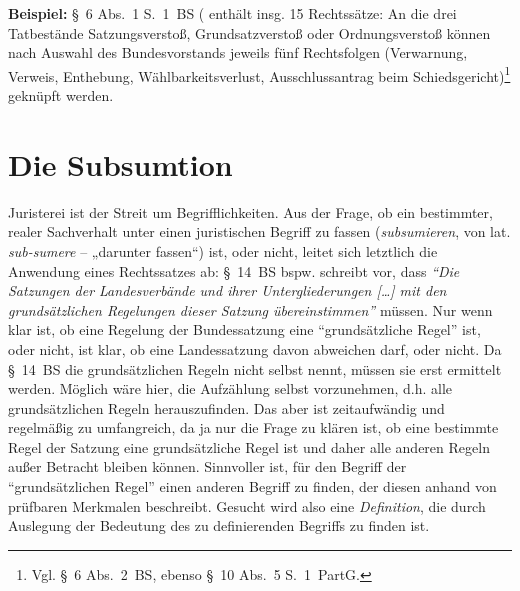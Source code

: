 \textbf{Beispiel:} \S~6 Abs.~1 S.~1~BS ( enthält insg. 15 Rechtssätze:
An die drei Tatbestände Satzungsverstoß, Grundsatzverstoß oder Ordnungsverstoß können nach Auswahl des Bundesvorstands jeweils fünf Rechtsfolgen (Verwarnung, Verweis, Enthebung, Wählbarkeitsverlust, Ausschlussantrag beim Schiedsgericht)\footnote{Vgl. \S~6 Abs.~2~BS, ebenso \S~10 Abs.~5 S.~1~PartG.} geknüpft werden.


\section{Die Subsumtion}
Juristerei ist der Streit um Begrifflichkeiten.
Aus der Frage, ob ein bestimmter, realer Sachverhalt unter einen juristischen Begriff zu fassen (\emph{subsumieren}, von lat. \emph{sub-sumere} – „darunter fassen“) ist, oder nicht, leitet sich letztlich die Anwendung eines Rechtssatzes ab:
\S~14~BS bspw. schreibt vor, dass \emph{\enquote{Die Satzungen der Landesverbände und ihrer Untergliederungen […] mit den grundsätzlichen Regelungen dieser Satzung übereinstimmen}} müssen.
Nur wenn klar ist, ob eine Regelung der Bundessatzung eine \enquote{grundsätzliche Regel} ist, oder nicht, ist klar, ob eine Landessatzung davon abweichen darf, oder nicht.
Da \S~14~BS die grundsätzlichen Regeln nicht selbst nennt, müssen sie erst ermittelt werden.
Möglich wäre hier, die Aufzählung selbst vorzunehmen, d.h. alle grundsätzlichen Regeln herauszufinden.
Das aber ist zeitaufwändig und regelmäßig zu umfangreich, da ja nur die Frage zu klären ist, ob eine bestimmte Regel der Satzung eine grundsätzliche Regel ist und daher alle anderen Regeln außer Betracht bleiben können.
Sinnvoller ist, für den Begriff der \enquote{grundsätzlichen Regel} einen anderen Begriff zu finden, der diesen anhand von prüfbaren Merkmalen beschreibt.
Gesucht wird also eine \emph{Definition}, die durch Auslegung der Bedeutung des zu definierenden Begriffs zu finden ist.

